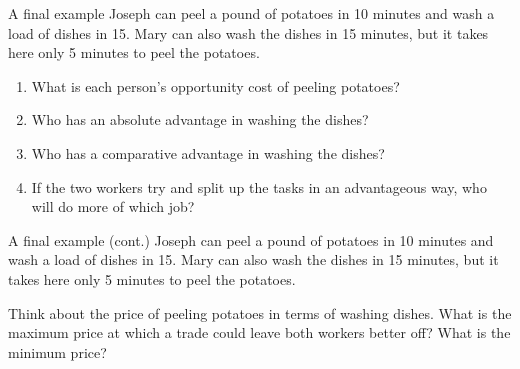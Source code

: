 \documentclass[aspectratio=169]{beamer}
\begin{document}
\begin{frame}{A final example}
    Joseph can peel a pound of potatoes in 10 minutes and wash a load of dishes in 15. Mary can also wash the dishes in 15 minutes, but it takes here only 5 minutes to peel the potatoes. 
    
    \begin{enumerate}
        \item What is each person's opportunity cost of peeling potatoes?
        \item Who has an absolute advantage in washing the dishes?
        \item Who has a comparative advantage in washing the dishes?
        \item If the two workers try and split up the tasks in an advantageous way, who will do more of which job?
    \end{enumerate}

\end{frame}

\begin{frame}{A final example (cont.)}
    Joseph can peel a pound of potatoes in 10 minutes and wash a load of dishes in 15. Mary can also wash the dishes in 15 minutes, but it takes here only 5 minutes to peel the potatoes. 
    
    \medskip

    Think about the price of peeling potatoes in terms of washing dishes. What is the maximum price at which a trade could leave both workers better off? What is the minimum price?

\end{frame}
\end{document}
